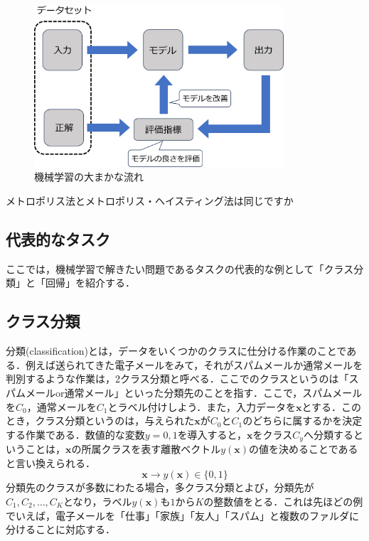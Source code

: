 \documentclass[a4paper,11pt]{jsreport}
\begin{document}
\begin{figure}[t]
  \begin{center}
    \includegraphics[height=6cm]{image/機械学習概要図.png}
    \caption{機械学習の大まかな流れ}
  \end{center}
\end{figure}
メトロポリス法とメトロポリス・ヘイスティング法は同じですか
\subsection{代表的なタスク}
ここでは，機械学習で解きたい問題であるタスクの代表的な例として「クラス分類」と「回帰」を紹介する．
\subsection*{クラス分類}
分類(classification)とは，データをいくつかのクラスに仕分ける作業のことである．例えば送られてきた電子メールをみて，それがスパムメールか通常メールを判別するような作業は，2クラス分類と呼べる．ここでのクラスというのは「スパムメールor通常メール」といった分類先のことを指す．ここで，スパムメールを$C_0$，通常メールを$C_1$とラベル付けしよう．また，入力データを$\bm{x}$とする．このとき，クラス分類というのは，与えられた$\bm{x}$が$C_0$と$C_1$のどちらに属するかを決定する作業である．数値的な変数$y = 0, 1$を導入すると，$\bm{x}$をクラス$C_{y}$へ分類するということは，$\bm{x}$の所属クラスを表す離散ベクトル$y(\bm{x})$の値を決めることであると言い換えられる．
\begin{equation}
  \bm{x} \longrightarrow y(\bm{x}) \in \{0, 1\}
\end{equation}
分類先のクラスが多数にわたる場合，多クラス分類とよび，分類先が$C_1,C_2,\dots,C_K$となり，ラベル$y(\bm{x})$も$1$から$K$の整数値をとる．これは先ほどの例でいえば，電子メールを「仕事」「家族」「友人」「スパム」と複数のファルダに分けることに対応する．
\end{document}
